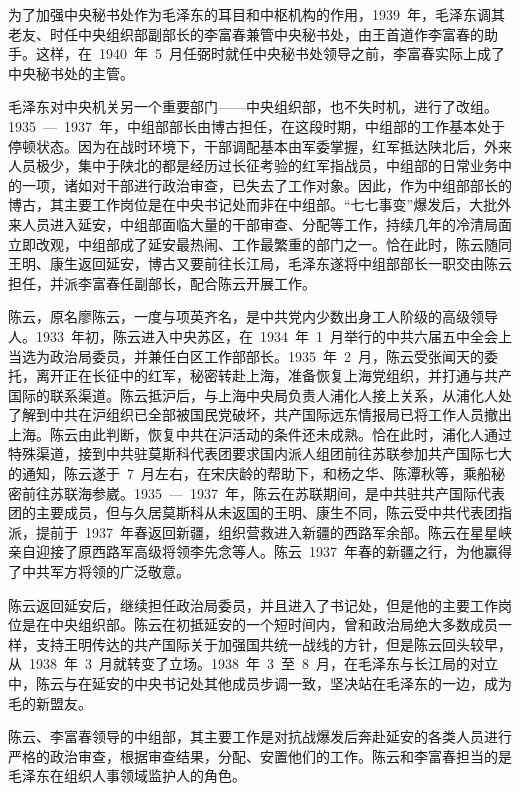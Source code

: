 为了加强中央秘书处作为毛泽东的耳目和中枢机构的作用，1939~年，毛泽东调其老友、时任中央组织部副部长的李富春兼管中央秘书处，由王首道作李富春的助手。这样，在~1940~年~5~月任弼时就任中央秘书处领导之前，李富春实际上成了中央秘书处的主管。

毛泽东对中央机关另一个重要部门——中央组织部，也不失时机，进行了改组。1935~—~1937~年，中组部部长由博古担任，在这段时期，中组部的工作基本处于停顿状态。因为在战时环境下，干部调配基本由军委掌握，红军抵达陕北后，外来人员极少，集中于陕北的都是经历过长征考验的红军指战员，中组部的日常业务中的一项，诸如对干部进行政治审查，已失去了工作对象。因此，作为中组部部长的博古，其主要工作岗位是在中央书记处而非在中组部。“七七事变”爆发后，大批外来人员进入延安，中组部面临大量的干部审查、分配等工作，持续几年的冷清局面立即改观，中组部成了延安最热闹、工作最繁重的部门之一。恰在此时，陈云随同王明、康生返回延安，博古又要前往长江局，毛泽东遂将中组部部长一职交由陈云担任，并派李富春任副部长，配合陈云开展工作。

陈云，原名廖陈云，一度与项英齐名，是中共党内少数出身工人阶级的高级领导人。1933~年初，陈云进入中央苏区，在~1934~年~1~月举行的中共六届五中全会上当选为政治局委员，并兼任白区工作部部长。1935~年~2~月，陈云受张闻天的委托，离开正在长征中的红军，秘密转赴上海，准备恢复上海党组织，并打通与共产国际的联系渠道。陈云抵沪后，与上海中央局负责人浦化人接上关系，从浦化人处了解到中共在沪组织已全部被国民党破坏，共产国际远东情报局已将工作人员撤出上海。陈云由此判断，恢复中共在沪活动的条件还未成熟。恰在此时，浦化人通过特殊渠道，接到中共驻莫斯科代表团要求国内派人组团前往苏联参加共产国际七大的通知，陈云遂于~7~月左右，在宋庆龄的帮助下，和杨之华、陈潭秋等，乘船秘密前往苏联海参崴。1935~—~1937~年，陈云在苏联期间，是中共驻共产国际代表团的主要成员，但与久居莫斯科从未返国的王明、康生不同，陈云受中共代表团指派，提前于~1937~年春返回新疆，组织营救进入新疆的西路军余部。陈云在星星峡亲自迎接了原西路军高级将领李先念等人。陈云~1937~年春的新疆之行，为他赢得了中共军方将领的广泛敬意。

陈云返回延安后，继续担任政治局委员，并且进入了书记处，但是他的主要工作岗位是在中央组织部。陈云在初抵延安的一个短时间内，曾和政治局绝大多数成员一样，支持王明传达的共产国际关于加强国共统一战线的方针，但是陈云回头较早，从~1938~年~3~月就转变了立场。1938~年~3~至~8~月，在毛泽东与长江局的对立中，陈云与在延安的中央书记处其他成员步调一致，坚决站在毛泽东的一边，成为毛的新盟友。

陈云、李富春领导的中组部，其主要工作是对抗战爆发后奔赴延安的各类人员进行严格的政治审查，根据审查结果，分配、安置他们的工作。陈云和李富春担当的是毛泽东在组织人事领域监护人的角色。

